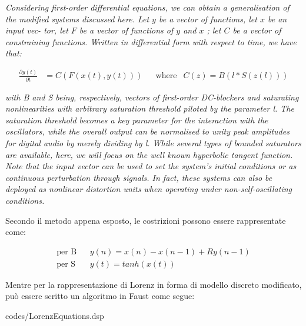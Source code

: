 \begin{center}
    \vspace{0.5cm}
    \textit{Considering first-order differential equations, 
we can obtain a generalisation of the modified systems discussed
here. Let \( y \) be a vector of functions, let \( x \) be an input vec-
tor, let \( F \) be a vector of functions of \( y \) and \( x \) ; let  \( C \) be
a vector of constraining functions. Written in differential
form with respect to time, we have that:}
\end{center}
\begin{align*}
    \frac{\partial y(t)}{\partial t} & = C(F(x(t), y(t)))
        &&\text{where} & C(z) = B(l * S(z(l)))
\end{align*}
\begin{center}
    \textit{with B and S being, respectively, vectors of first-order
    DC-blockers and saturating nonlinearities with arbitrary
    saturation threshold piloted by the parameter l. The saturation threshold 
    becomes a key parameter for the interaction with the oscillators, while the overall output can be
    normalised to unity peak amplitudes for digital audio by
    merely dividing by l. While several types of bounded saturators are available, here, 
    we will focus on the well known 
    hyperbolic tangent function. Note that the input
    vector can be used to set the system’s initial conditions or
    as continuous perturbation through signals. In fact, these
    systems can also be deployed as nonlinear distortion units
    when operating under non-self-oscillating conditions.}
    \vspace{0.5cm}
\end{center}

Secondo il metodo appena esposto, le costrizioni possono essere rappresentate come:

\begin{center}
\begin{align*}
    \text{per B} && y(n) = x(n) -x(n-1) +Ry(n-1) \\
    \text{per S} && y(t) = tanh(x(t))
\end{align*}
\end{center}

Mentre per la rappresentazione di Lorenz in forma di modello discreto modificato,
può essere scritto un algoritmo in Faust come segue:

\vspace{0.5cm} 

{codes/LorenzEquations.dsp}

